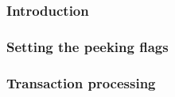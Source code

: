 \subsubsection{Introduction                \lispNone{}}   \label{hub: tx skip: noop: intro}                     
\subsubsection{Setting the peeking flags   }   \label{hub: tx skip: noop: setting peeking flags}      %
\subsubsection{Transaction processing      }   \label{hub: tx skip: noop: transaction processing}     %

